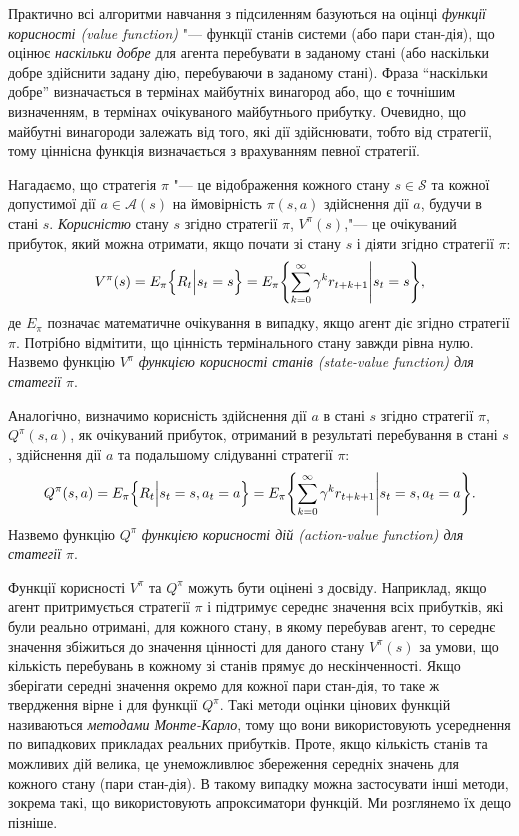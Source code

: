 Практично всі алгоритми навчання з підсиленням базуються на оцінці \emph{функції корисності (value function)} "--- функції станів системи (або пари стан-дія), що оцінює \emph{наскільки добре} для агента перебувати в заданому стані (або наскільки добре здійснити задану дію, перебуваючи в заданому стані). Фраза ``наскільки добре'' визначається в термінах майбутніх винагород або, що є точнішим визначенням, в термінах очікуваного майбутнього прибутку. Очевидно, що майбутні винагороди залежать від того, які дії здійснювати, тобто від стратегії, тому ціннісна функція визначається з врахуванням певної стратегії.

Нагадаємо, що стратегія $\pi$ "--- це відображення кожного стану $s \in \mathcal{S}$ та кожної допустимої дії $a \in \mathcal{A}(s)$ на ймовірність $\pi(s,a)$ здійснення дії $a$, будучи в стані $s$. \emph{Корисністю} стану $s$ згідно стратегії $\pi$, $V^\pi(s)$,"--- це очікуваний прибуток, який можна отримати, якщо почати зі стану $s$ і діяти згідно стратегії $\pi$:
\begin{equation}
V^\pi(s) = E_\pi \Bigl\{ R_t \Big| s_t = s \Bigr \} = E_\pi \Biggl\{\sum_{k=0}^{\infty}\gamma^k r_{t+k+1} \Bigg| s_t=s \Biggr\},
\end{equation}
де $E_\pi{}$ позначає математичне очікування в випадку, якщо агент діє згідно стратегії $\pi$. Потрібно відмітити, що цінність термінального стану завжди рівна нулю. Назвемо функцію $V^\pi$ \emph{функцією корисності станів (state-value function) для статегії $\pi$}.

Аналогічно, визначимо корисність здійснення дії $a$ в стані $s$ згідно стратегії $\pi$, $Q^\pi(s,a)$, як очікуваний прибуток, отриманий в результаті перебування в стані $s$, здійснення дії $a$ та подальшому слідуванні стратегії $\pi$:
\begin{equation}
Q^\pi(s,a)=E_\pi \Bigl\{ R_t \Big| s_t=s, a_t=a \Bigr\} = E_\pi \Biggl\{\sum_{k=0}^{\infty}\gamma^k r_{t+k+1} \Bigg| s_t=s,a_t=a \Biggr\}.
\end{equation}
Назвемо функцію $Q^\pi$ \emph{функцією корисності дій (action-value function) для статегії $\pi$}.

Функції корисності $V^\pi$ та $Q^\pi$ можуть бути оцінені з досвіду. Наприклад, якщо агент притримується стратегії $\pi$ і підтримує середнє значення всіх прибутків, які були реально отримані, для кожного стану, в якому перебував агент, то середнє значення збіжиться до значення цінності для даного стану $V^\pi(s)$ за умови, що кількість перебувань в кожному зі станів прямує до нескінченності. Якщо зберігати середні значення окремо для кожної пари стан-дія, то таке ж твердження вірне і для функції $Q^\pi$. Такі методи оцінки цінових функцій називаються \emph{методами Монте-Карло}, тому що вони використовують усереднення по випадкових прикладах реальних прибутків. Проте, якщо кількість станів та можливих дій велика, це унеможливлює збереження середніх значень для кожного стану (пари стан-дія). В такому випадку можна застосувати інші методи, зокрема такі, що використовують апроксиматори функцій. Ми розглянемо їх дещо пізніше.

